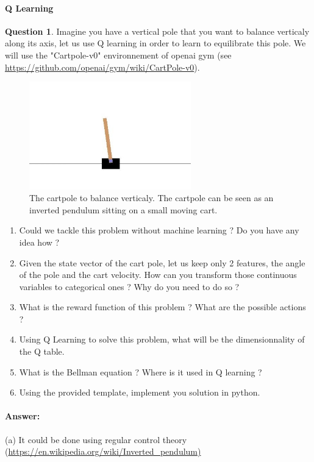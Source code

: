 \documentclass[11pt,a4paper]{article}
\theoremstyle{definition}%
\newtheorem{Q}{Question}[] %
\newcommand{\reponse}[1]{%
\ifthenelse {\boolean{corrige}} {\paragraph{Answer:} \color{darkblue}   #1\color{black}} {}
}
\begin{document}
\paragraph{Q Learning}
\begin{Q}
Imagine you have a vertical pole that you want to balance verticaly along its axis,
let us use Q learning in order to learn to equilibrate this pole. We will use the "Cartpole-v0"
environnement of openai gym (see \url{https://github.com/openai/gym/wiki/CartPole-v0}).

\begin{figure}[h]
    \centering
\includegraphics[width=7cm]{cartpole.jpg}
    \caption{The cartpole to balance verticaly. The cartpole can be seen as an inverted pendulum
    sitting on a small moving cart.}
\end{figure}

\begin{enumerate}
    \item Could we tackle this problem without machine learning ? Do you have any idea how ?
    \item Given the state vector of the cart pole, let us keep only 2 features, the angle of the
        pole and the cart velocity. How can you transform those continuous variables to
        categorical ones ? Why do you need to do so ?
    \item What is the reward function of this problem ? What are the possible actions ?
    \item Using Q Learning to solve this problem, what will be the dimensionnality of the Q table.
    \item What is the Bellman equation ? Where is it used in Q learning ?
    \item Using the provided template, implement you solution in python. 

\end{enumerate}

\reponse{
    (a) It could be done using regular control theory (\url{https://en.wikipedia.org/wiki/Inverted_pendulum)}\\

}
\end{Q}
\end{document}
